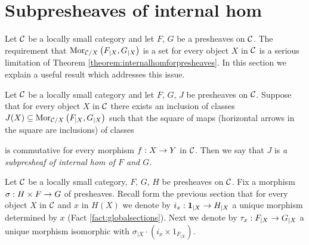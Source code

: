 \section{Subpresheaves of internal hom}
\noindent
Let ${\mathcal C}$ be a locally small category and let $F$, $G$ be a presheaves on ${\mathcal C}$. The requirement that $\mathrm{Mor}_{{\mathcal C}/X}\left(F_{\mid X},G_{\mid X}\right)$ is a set for every object $X$ in ${\mathcal C}$ is a serious limitation of Theorem \ref{theorem:internalhomforpresheaves}. In this section we explain a useful result which addresses this issue.

\begin{definition}
Let ${\mathcal C}$ be a locally small category and let $F$, $G$, $J$ be presheaves on ${\mathcal C}$. Suppose that for every object $X$ in ${\mathcal C}$ there exists an inclusion of classes $J(X)\subseteq \mathrm{Mor}_{{\mathcal C}/X}\left(F_{\mid X},G_{\mid X}\right)$ such that the square of maps (horizontal arrows in the square are inclusions) of classes
\begin{center}
\end{center}
is commutative for every morphism $f:X\rightarrow Y$ in ${\mathcal C}$. Then we say that $J$ is \textit{a subpresheaf of internal hom of $F$ and $G$}.
\end{definition}
\noindent
Let ${\mathcal C}$ be a locally small category, $F$, $G$, $H$ be presheaves on ${\mathcal C}$. Fix a morphism $\sigma:H\times F\rightarrow G$ of presheaves. Recall form the previous section that for every object $X$ in ${\mathcal C}$ and $x$ in $H(X)$ we denote by $i_x:\mathbf{1}_{\mid X}\rightarrow H_{\mid X}$ a unique morphism determined by $x$ (Fact \ref{fact:globalsections}). Next we denote by $\tau_x:F_{\mid X}\rightarrow G_{\mid X}$ a unique morphism isomorphic with $\sigma_{\mid X}\cdot \left(i_x\times 1_{F_{\mid X}}\right)$. 

